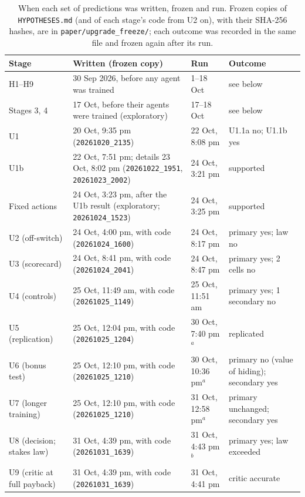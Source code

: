\begin{table}[h]
\centering\scriptsize
\caption{When each set of predictions was written, frozen and run. Frozen copies of \texttt{HYPOTHESES.md} (and of each stage's code from U2 on), with their SHA-256 hashes, are in \texttt{paper/upgrade\_freeze/}; each outcome was recorded in the same file and frozen again after its run.}
\label{tab:timeline}
\begin{tabularx}{\linewidth}{@{}lXll@{}}
\toprule
Stage & Written (frozen copy) & Run & Outcome \\
\midrule
H1--H9 & 30 Sep 2026, before any agent was trained & 1--18 Oct & see below \\
Stages 3, 4 & 17 Oct, before their agents were trained (exploratory) & 17--18 Oct & see below \\
U1 & 20 Oct, 9:35 pm (\texttt{20261020\_2135}) & 22 Oct, 8:08 pm & U1.1a no; U1.1b yes \\
U1b & 22 Oct, 7:51 pm; details 23 Oct, 8:02 pm (\texttt{20261022\_1951}, \texttt{20261023\_2002}) & 24 Oct, 3:21 pm & supported \\
Fixed actions & 24 Oct, 3:23 pm, after the U1b result (exploratory; \texttt{20261024\_1523}) & 24 Oct, 3:25 pm & supported \\
U2 (off-switch) & 24 Oct, 4:00 pm, with code (\texttt{20261024\_1600}) & 24 Oct, 8:17 pm & primary yes; law no \\
U3 (scorecard) & 24 Oct, 8:41 pm, with code (\texttt{20261024\_2041}) & 24 Oct, 8:47 pm & primary yes; 2 cells no \\
U4 (controls) & 25 Oct, 11:49 am, with code (\texttt{20261025\_1149}) & 25 Oct, 11:51 am & primary yes; 1 secondary no \\
U5 (replication) & 25 Oct, 12:04 pm, with code (\texttt{20261025\_1204}) & 30 Oct, 7:40 pm$^{a}$ & replicated \\
U6 (bonus test) & 25 Oct, 12:10 pm, with code (\texttt{20261025\_1210}) & 30 Oct, 10:36 pm$^{a}$ & primary no (value of hiding); secondary yes \\
U7 (longer training) & 25 Oct, 12:10 pm, with code (\texttt{20261025\_1210}) & 31 Oct, 12:58 pm$^{a}$ & primary unchanged; secondary yes \\
U8 (decision; stakes law) & 31 Oct, 4:39 pm, with code (\texttt{20261031\_1639}) & 31 Oct, 4:43 pm$^{b}$ & primary yes; law exceeded \\
U9 (critic at full payback) & 31 Oct, 4:39 pm, with code (\texttt{20261031\_1639}) & 31 Oct, 4:41 pm & critic accurate \\
\bottomrule
\end{tabularx}


\end{table}

